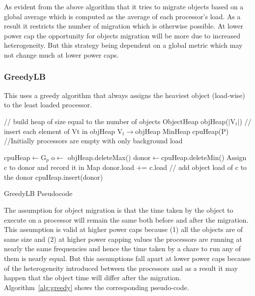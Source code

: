  As evident from the above algorithm that it tries to migrate objects based on
 a global average which is computed as the average of each processor's load.
 As a result it restricts the number of migration which is otherwise possible.
 At lower power cap  the opportunity for objects migration will be more due to
 increased heterogeneity.  But this strategy being dependent on a global metric
 which may not change much at lower power caps.

\subsubsection{GreedyLB}
This uses a greedy algorithm that always assigns the heaviest object (load-wise) to the
least loaded processor. 

\begin{algorithm}

 // build heap of size equal to the number of objects \;
 ObjectHeap objHeap($|$V$_t|$)\;
 // insert each element of Vt in objHeap\;
 V$_t\rightarrow$objHeap \; 
 MinHeap cpuHeap(P)\;
 //Initially processors are empty with only background load\; 

 cpuHeap$\leftarrow$G$_p$\;  
  {
    o$\leftarrow$ objHeap.deleteMax()\;
    donor$\leftarrow$cpuHeap.deleteMin()\;
    Assign c to donor and record it in Map\;
    donor.load += c.load // add object load of c to the donor\;
    cpuHeap.insert(donor) \;
    }
 \caption{GreedyLB Pseudocode}
 \label{alg:greedy}
\end{algorithm}

The assumption for object migration is that the time taken by the object to
execute on a processor will remain the same both before and after the
migration.  This assumption is valid at higher power caps because (1) all the
objects are of same size and (2) at higher power capping values the processors
are running at nearly the same frequencies and hence the time taken by a chare
to run any of them is nearly equal.  But this assumptions fall apart at lower
power caps because of the heterogeneity introduced between the processors and
as a result it may happen that the object time will differ after the migration.
Algorithm~\ref{alg:greedy} shows the corresponding pseudo-code.

